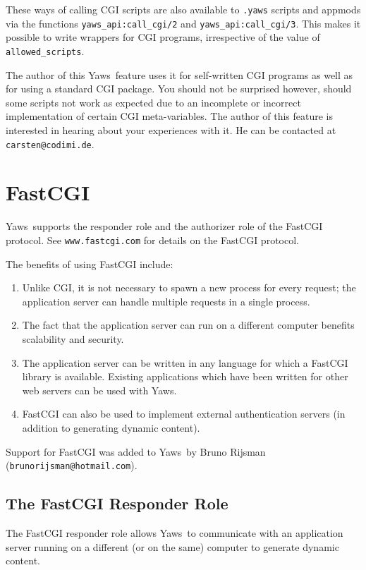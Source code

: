\documentclass[11pt,oneside,english]{book}
\newcommand{\Yaws}            %
        {{\sc Yaws}}
\begin{document}
These ways of calling CGI scripts are also available to \verb+.yaws+
scripts and appmods via the functions \verb+yaws_api:call_cgi/2+ and
\verb+yaws_api:call_cgi/3+.  This makes it possible to write wrappers
for CGI programs, irrespective of the value of \verb+allowed_scripts+.

The author of this \Yaws\  feature uses it for self-written CGI programs
as well as for using a standard CGI package.  You should not be
surprised however, should some scripts not work as expected due to an
incomplete or incorrect implementation of certain CGI meta-variables.
The author of this feature is interested in hearing about your
experiences with it.  He can be contacted at \verb+carsten@codimi.de+.

\chapter{FastCGI}

\Yaws\  supports the responder role and the authorizer role of the
FastCGI protocol. See \verb+www.fastcgi.com+ for details on the
FastCGI protocol.

The benefits of using FastCGI include:
\begin{enumerate}
\item Unlike CGI, it is not necessary to spawn a new process for
every request; the application server can handle multiple requests
in a single process.
\item The fact that the application server can run on a different
computer benefits scalability and security.
\item The application server can be written in any language for
which a FastCGI library is available. Existing applications
which have been written for other web servers can be used with
\Yaws{}.
\item FastCGI can also be used to implement external authentication
servers (in addition to generating dynamic content).
\end{enumerate}

Support for FastCGI was added to \Yaws\  by Bruno Rijsman
(\verb+brunorijsman@hotmail.com+).

\section{The FastCGI Responder Role}

The FastCGI responder role allows \Yaws\  to communicate with an
application server running on a different (or on the same) computer
to generate dynamic content.
\end{document}
